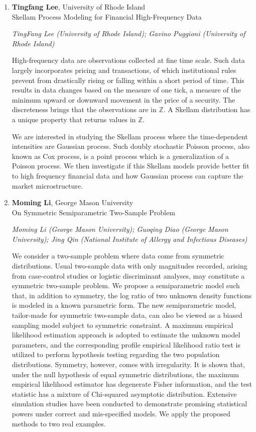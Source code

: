 \begin{enumerate}
\item \textbf{Tingfang Lee}, University of Rhode Island \\
Skellam Process Modeling for Financial High-Frequency Data

\emph{\footnotesize TingFang Lee (University of Rhode Island); Gavino Puggioni (University of Rhode Island)}

High-frequency data are observations collected at fine time scale. Such data largely incorporates pricing and transactions, of which institutional rules prevent from drastically rising or falling within a short period of time. This results in data changes based on the measure of one tick, a measure of the minimum upward or downward movement in the price of a security.  The discreteness brings that the observations are in $\mathbb{Z}$. A Skellam distribution has a unique property that returns values in $\mathbb{Z}$. 

We are interested in studying the Skellam process where the time-dependent intensities are Gaussian process. Such doubly stochastic Poisson process, also known as Cox process, is a point process which is a generalization of a Poisson process. We then investigate if this Skellam models provide better fit to high frequency financial data and how Gaussian process can capture the market microstructure.

\item \textbf{Moming Li}, George Mason University \\
On Symmetric Semiparametric Two-Sample Problem

\emph{\footnotesize Moming Li (George Mason University); Guoqing Diao (George Mason University); Jing Qin (National Institute of Allergy and Infectious Diseases)}

We consider a two-sample problem where data come from symmetric distributions. Usual two-sample data with only magnitudes recorded, arising from case-control studies or logistic discriminant analyses, may constitute a symmetric two-sample problem. We propose a semiparametric model such that, in addition to symmetry, the log ratio of two unknown density functions is modeled in a known parametric form. The new semiparametric model, tailor-made for symmetric two-sample data, can also be viewed as a biased sampling model subject to symmetric constraint. A maximum empirical likelihood estimation approach is adopted to estimate the unknown model parameters, and the corresponding profile empirical likelihood ratio test is utilized to perform hypothesis testing regarding the two population distributions. Symmetry, however, comes with irregularity. It is shown that, under the null hypothesis of equal symmetric distributions, the maximum empirical likelihood estimator has degenerate Fisher information, and the test statistic has a mixture of Chi-squared asymptotic distribution. Extensive simulation studies have been conducted to demonstrate promising statistical powers under correct and mis-specified models. We apply the proposed methods to two real examples.


\end{enumerate}
